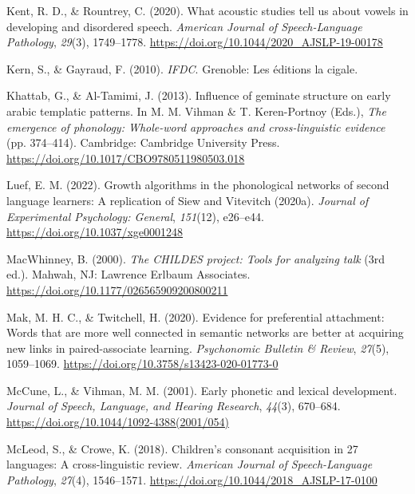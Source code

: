 \documentclass[
  man]{apa6}
\newlength{\cslhangindent}
\newlength{\cslentryspacingunit} %
\newenvironment{CSLReferences}[2] %
 {%
  \setlength{\parindent}{0pt}
  \ifodd #1
  \let\oldpar\par
  \def\par{\hangindent=\cslhangindent\oldpar}
  \fi
  \setlength{\parskip}{#2\cslentryspacingunit}
 }%
 {}
\begin{document}
\begin{CSLReferences}{1}{0}
\leavevmode{}%
Kent, R. D., \& Rountrey, C. (2020). What acoustic studies tell us about vowels in developing and disordered speech. \emph{American Journal of Speech-Language Pathology}, \emph{29}(3), 1749--1778. \url{https://doi.org/10.1044/2020_AJSLP-19-00178}

\leavevmode{}%
Kern, S., \& Gayraud, F. (2010). \emph{{IFDC}}. Grenoble: Les éditions la cigale.

\leavevmode{}%
Khattab, G., \& Al-Tamimi, J. (2013). Influence of geminate structure on early arabic templatic patterns. In M. M. Vihman \& T. Keren-Portnoy (Eds.), \emph{The emergence of phonology: Whole-word approaches and cross-linguistic evidence} (pp. 374--414). Cambridge: Cambridge University Press. \url{https://doi.org/10.1017/CBO9780511980503.018}

\leavevmode{}%
Luef, E. M. (2022). Growth algorithms in the phonological networks of second language learners: {A} replication of {Siew} and {Vitevitch} (2020a). \emph{Journal of Experimental Psychology: General}, \emph{151}(12), e26--e44. \url{https://doi.org/10.1037/xge0001248}

\leavevmode{}%
MacWhinney, B. (2000). \emph{The {CHILDES} project: Tools for analyzing talk} (3rd ed.). Mahwah, {NJ}: Lawrence Erlbaum Associates. \url{https://doi.org/10.1177/026565909200800211}

\leavevmode{}%
Mak, M. H. C., \& Twitchell, H. (2020). Evidence for preferential attachment: Words that are more well connected in semantic networks are better at acquiring new links in paired-associate learning. \emph{Psychonomic Bulletin \& Review}, \emph{27}(5), 1059--1069. \url{https://doi.org/10.3758/s13423-020-01773-0}

\leavevmode{}%
McCune, L., \& Vihman, M. M. (2001). Early phonetic and lexical development. \emph{Journal of Speech, Language, and Hearing Research}, \emph{44}(3), 670--684. \url{https://doi.org/10.1044/1092-4388(2001/054)}

\leavevmode{}%
McLeod, S., \& Crowe, K. (2018). Children's consonant acquisition in 27 languages: A cross-linguistic review. \emph{American Journal of Speech-Language Pathology}, \emph{27}(4), 1546--1571. \url{https://doi.org/10.1044/2018_AJSLP-17-0100}


\end{CSLReferences}
\end{document}
